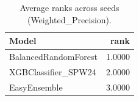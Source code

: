 \begin{table}[t]
\centering
\begin{tabular}{lr}
\toprule
Model & rank \\
\midrule
BalancedRandomForest & 1.0000 \\
XGBClassifier_SPW24 & 2.0000 \\
EasyEnsemble & 3.0000 \\
\bottomrule
\end{tabular}
\caption{Average ranks across seeds (Weighted_Precision).}
\label{tab:avg_rank_Weighted_Precision}
\end{table}